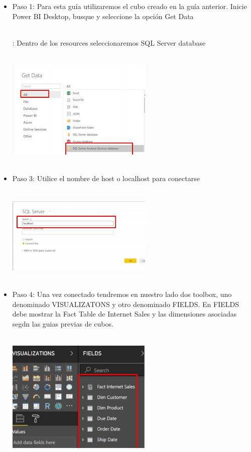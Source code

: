 \documentclass[preprint,12pt]{elsarticle}
\begin{document}
	
		\begin{itemize}
			
			\\ \item Paso 1: Para esta guía utilizaremos el cubo creado en la guía anterior. Inicie Power BI Desktop, busque y seleccione la opción Get Data
			
			
		
			\\ : Dentro de los resources seleccionaremos SQL Server database
			
				\\ \includegraphics[width=7cm]{./IMAGENES/2} \\
			
			
			\\ \item Paso 3: Utilice el nombre de host o localhost para conectarse
			
			
				\\ \includegraphics[width=7cm]{./IMAGENES/3} \\
			
			
			\\ \item Paso 4: Una vez conectado tendremos en nuestro lado dos toolbox, uno denominado VISUALIZATONS y otro denominado FIELDS.
			En FIELDS debe mostrar la Fact Table de Internet Sales y las dimensiones asociadas segdn las guias previas de cubos.
			
				\\ \includegraphics[width=7cm]{./IMAGENES/4} \\
			

\end{itemize}
\end{document}
